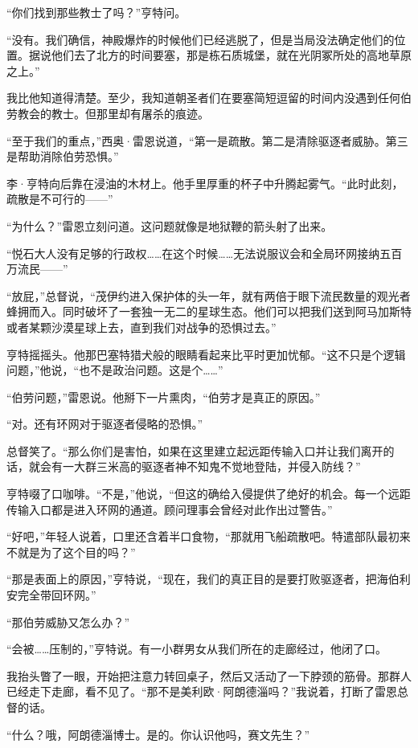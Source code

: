\documentclass[AutoFakeBold=true]{book}
\begin{document}
``你们找到那些教士了吗？''亨特问。

``没有。我们确信，神殿爆炸的时候他们已经逃脱了，但是当局没法确定他们的位置。据说他们去了北方的时间要塞，那是栋石质城堡，就在光阴冢所处的高地草原之上。''

{\kaishu 我比他知道得清楚。至少，我知道朝圣者们在要塞简短逗留的时间内没遇到任何伯劳教会的教士。但那里却有屠杀的痕迹。}

``至于我们的重点，''西奥·雷恩说道，``第一是疏散。第二是清除驱逐者威胁。第三是帮助消除伯劳恐惧。''

李·亨特向后靠在浸油的木材上。他手里厚重的杯子中升腾起雾气。``此时此刻，疏散是不可行的——''

``为什么？''雷恩立刻问道。这问题就像是地狱鞭的箭头射了出来。

``悦石大人没有足够的行政权……在这个时候……无法说服议会和全局环网接纳五百万流民——''

``放屁，''总督说，``茂伊约进入保护体的头一年，就有两倍于眼下流民数量的观光者蜂拥而入。同时破坏了一套独一无二的星球生态。他们可以把我们送到阿马加斯特或者某颗沙漠星球上去，直到我们对战争的恐惧过去。''

亨特摇摇头。他那巴塞特猎犬般的眼睛看起来比平时更加忧郁。``这不只是个逻辑问题，''他说，``也不是政治问题。这是个……''

``伯劳问题，''雷恩说。他掰下一片熏肉，``伯劳才是真正的原因。''

``对。还有环网对于驱逐者侵略的恐惧。''

总督笑了。``那么你们是害怕，如果在这里建立起远距传输入口并让我们离开的话，就会有一大群三米高的驱逐者神不知鬼不觉地登陆，并侵入防线？''

亨特啜了口咖啡。``不是，''他说，``但这的确给入侵提供了绝好的机会。每一个远距传输入口都是进入环网的通道。顾问理事会曾经对此作出过警告。''

``好吧，''年轻人说着，口里还含着半口食物，``那就用飞船疏散吧。特遣部队最初来不就是为了这个目的吗？''

``那是{\kaishu 表面上}的原因，''亨特说，``现在，我们的真正目的是要打败驱逐者，把海伯利安完全带回环网。''

``那伯劳威胁又怎么办？''

``会被……压制的，''亨特说。有一小群男女从我们所在的走廊经过，他闭了口。

我抬头瞥了一眼，开始把注意力转回桌子，然后又活动了一下脖颈的筋骨。那群人已经走下走廊，看不见了。``那不是美利欧·阿朗德淄吗？''我说着，打断了雷恩总督的话。

``什么？哦，阿朗德淄博士。是的。你认识他吗，赛文先生？''
\end{document}
